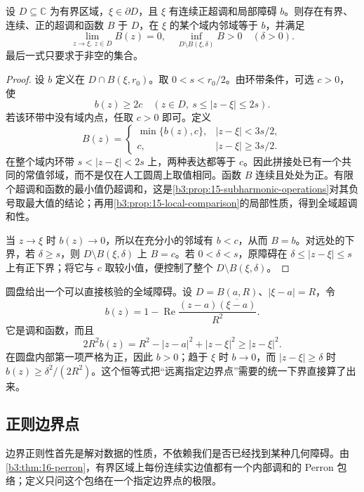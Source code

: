 \begin{lemma}[局部障碍的全域化]\label{b3:lem:16-global-barrier}
设 \(D\subseteq\mathbb C\) 为有界区域，\(\xi\in\partial D\)，且 \(\xi\) 有连续正超调和局部障碍 \(b\)。则存在有界、连续、正的超调和函数 \(B\) 于 \(D\)，在 \(\xi\) 的某个域内邻域等于 \(b\)，并满足
\[
 \lim_{z\to\xi,\ z\in D}B(z)=0,
 \quad
 \inf_{D\setminus B(\xi,\delta)}B>0
 \quad(\delta>0).
\]
最后一式只要求于非空的集合。
\end{lemma}
\begin{proof}
设 \(b\) 定义在 \(D\cap B(\xi,r_0)\)。取 \(0<s<r_0/2\)。由环带条件，可选 \(c>0\)，使
\[
 b(z)\ge2c
 \quad\left(z\in D,\ s\le|z-\xi|\le2s\right).
\]
若该环带中没有域内点，任取 \(c>0\) 即可。定义
\[
 B(z)=
 \begin{cases}
 \min\{b(z),c\},&|z-\xi|<3s/2,\\
 c,&|z-\xi|\ge3s/2.
 \end{cases}
\]
在整个域内环带 \(s<|z-\xi|<2s\) 上，两种表达都等于 \(c\)。因此拼接处已有一个共同的常值邻域，而不是仅在人工圆周上取值相同。函数 \(B\) 连续且处处为正。有限个超调和函数的最小值仍超调和，这是\cref{b3:prop:15-subharmonic-operations}对其负号取最大值的结论；再用\cref{b3:prop:15-local-comparison}的局部性质，得到全域超调和性。

当 \(z\to\xi\) 时 \(b(z)\to0\)，所以在充分小的邻域有 \(b<c\)，从而 \(B=b\)。对远处的下界，若 \(\delta\ge s\)，则 \(D\setminus B(\xi,\delta)\) 上 \(B=c\)。若 \(0<\delta<s\)，原障碍在 \(\delta\le|z-\xi|\le s\) 上有正下界；将它与 \(c\) 取较小值，便控制了整个 \(D\setminus B(\xi,\delta)\)。
\end{proof}
圆盘给出一个可以直接核验的全域障碍。设 \(D=B(a,R)\)、\(|\xi-a|=R\)，令
\[
 b(z)=1-\operatorname{Re}\frac{(z-a)\overline{(\xi-a)}}{R^2}.
\]
它是调和函数，而且
\[
 2R^2b(z)=R^2-|z-a|^2+|z-\xi|^2\ge|z-\xi|^2.
\]
在圆盘内部第一项严格为正，因此 \(b>0\)；趋于 \(\xi\) 时 \(b\to0\)，而 \(|z-\xi|\ge\delta\) 时 \(b(z)\ge\delta^2/(2R^2)\)。这个恒等式把“远离指定边界点”需要的统一下界直接算了出来。

\subsection{正则边界点}
\label{b3:subsec:160302}

边界正则性首先是解对数据的性质，不依赖我们是否已经找到某种几何障碍。由\cref{b3:thm:16-perron}，有界区域上每份连续实边值都有一个内部调和的 Perron 包络；定义只问这个包络在一个指定边界点的极限。

